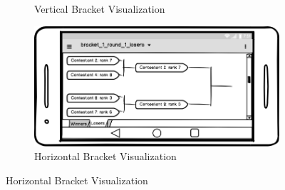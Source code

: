 \documentclass{article}
\begin{document}
\begin{figure}[!htb]
\begin{subfigure}{0.3\textwidth}
        \caption{Vertical Bracket Visualization} \label{fig:x_c}
    \end{subfigure}
    \begin{subfigure}{1\textwidth}
        \includegraphics[width=\linewidth]{figs/bracket_1_round_2_losers.png}
        \caption{Horizontal Bracket Visualization} \label{fig:x_c}
    \end{subfigure}
\end{figure}

% 
% 
\end{document}
